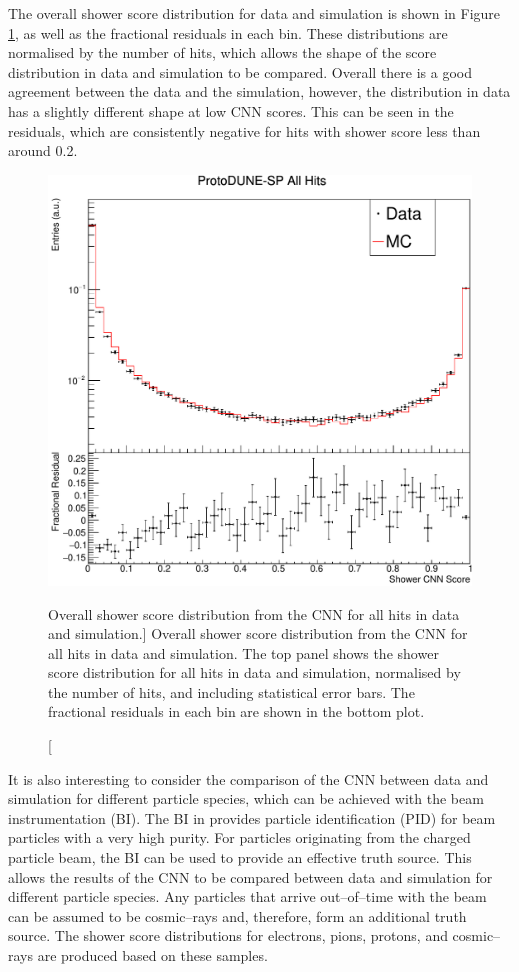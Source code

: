 The overall shower score distribution for data and simulation is shown in 
Figure \ref{fig:cnn_overall_score}, as well as the fractional residuals in 
each bin. These distributions are normalised by the number of hits, which allows
the shape of the score distribution in data and simulation to be 
compared. Overall there is a good agreement between the data and the 
simulation, however, the distribution in data has a slightly different shape 
at low CNN scores. This can be seen in the residuals, which are consistently 
negative for hits with shower score less than around 0.2.
\begin{figure}
	\centering
	\includegraphics[width=\textwidth]{figures/hit_cnn_all.pdf}
	\caption
	[Overall shower score distribution from the CNN for all hits in data and simulation.]
	{Overall shower score distribution from the CNN for all hits in data and
	simulation. The top panel shows the shower score distribution for all hits in
	data and simulation, normalised by the number of hits, and including
	statistical error bars. The fractional residuals in each bin are shown in the 
	bottom plot.}
	\label{fig:cnn_overall_score}
\end{figure}

It is also interesting to consider the comparison of the CNN between data and
simulation for different particle species, which can be achieved with the beam
instrumentation (BI). The BI in \protodune{} provides particle identification 
(PID) for beam particles with a very high purity. For particles originating 
from the charged particle beam, the BI can be used to provide an effective 
truth source. This allows the results of the CNN to be compared between data 
and simulation for different particle species. Any particles that arrive 
out--of--time with the beam can be assumed to be cosmic--rays and, therefore, 
form an additional truth source. The shower score distributions for electrons, 
pions, protons, and cosmic--rays are produced based on these samples. 

